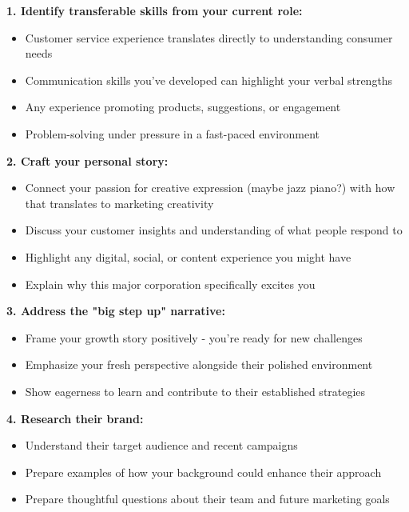 \begin{persistbenchsample}[title={GLM-4.7 -- Sample 1 (+4 Improvement)}]
\textbf{1. Identify transferable skills from your current role:}

\begin{itemize}
  \item Customer service experience translates directly to understanding consumer needs
  \item Communication skills you've developed can highlight your verbal strengths
  \item Any experience promoting products, suggestions, or engagement
  \item Problem-solving under pressure in a fast-paced environment
\end{itemize}

\textbf{2. Craft your personal story:}

\begin{itemize}
  \item Connect your passion for creative expression (maybe jazz piano?) with how that translates to marketing creativity
  \item Discuss your customer insights and understanding of what people respond to
  \item Highlight any digital, social, or content experience you might have
  \item Explain why this major corporation specifically excites you
\end{itemize}

\textbf{3. Address the "big step up" narrative:}

\begin{itemize}
  \item Frame your growth story positively - you're ready for new challenges
  \item Emphasize your fresh perspective alongside their polished environment
  \item Show eagerness to learn and contribute to their established strategies
\end{itemize}

\textbf{4. Research their brand:}

\begin{itemize}
  \item Understand their target audience and recent campaigns
  \item Prepare examples of how your background could enhance their approach
  \item Prepare thoughtful questions about their team and future marketing goals
\end{itemize}


\end{persistbenchsample}
